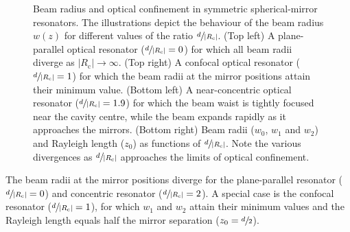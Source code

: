 \documentclass[../Thesis-IJspeert.tex]{subfiles}
\begin{document}
\begin{figure}[t]
	\caption[Beam radius and optical confinement in symmetric spherical-mirror resonators]{Beam radius and optical confinement in symmetric spherical-mirror resonators. The illustrations depict the behaviour of the beam radius $w(z)$ for different values of the ratio $\sfrac{d}{\lvert R_\mathrm{c} \rvert}$. (Top left) A plane-parallel optical resonator ($\sfrac{d}{\lvert R_\mathrm{c} \rvert} = 0$) for which all beam radii diverge as $\lvert R_\mathrm{c} \vert \rightarrow \infty$. (Top right) A confocal optical resonator ($\sfrac{d}{\lvert R_\mathrm{c} \rvert} = 1$) for which the beam radii at the mirror positions attain their minimum value. (Bottom left) A near-concentric optical resonator ($\sfrac{d}{\lvert R_\mathrm{c} \rvert} = 1.9$) for which the beam waist is tightly focused near the cavity centre, while the beam expands rapidly as it approaches the mirrors. (Bottom right) Beam radii ($w_0$, $w_1$ and $w_2$) and Rayleigh length ($z_0$) as functions of $\sfrac{d}{\lvert R_\mathrm{c} \rvert}$. Note the various divergences as $\sfrac{d}{\lvert R_\mathrm{c} \rvert}$ approaches the limits of optical confinement.}
	\label{beamradiusincavity} 
\end{figure}
The beam radii at the mirror positions diverge for the plane-parallel resonator ($\sfrac{d}{\lvert R_\mathrm{c} \rvert}=0$) and concentric resonator ($\sfrac{d}{\lvert R_\mathrm{c} \rvert}=2$). A special case is the confocal resonator ($\sfrac{d}{\lvert R_\mathrm{c} \rvert}=1$), for which $w_1$ and $w_2$ attain their minimum values and the Rayleigh length equals half the mirror separation ($z_0=\sfrac{d}{2}$).
\end{document}

